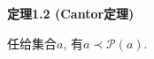 
\vspace{15pt}

\hypertarget{sec:定理1.2}{}
\noindent\textbf{定理1.2 (Cantor定理)}

任给集合$a$, 有$a\prec\mathcal{P}(a)$.


